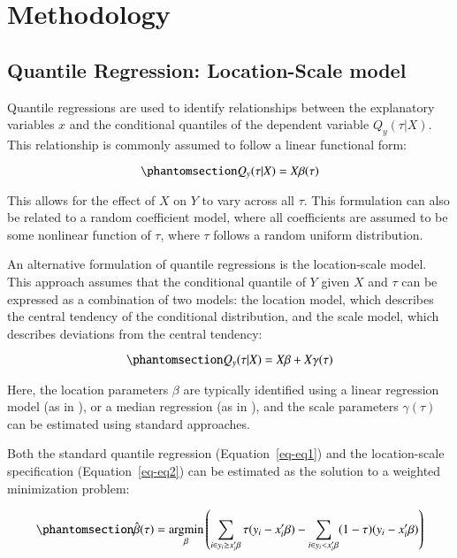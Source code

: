 \documentclass[
  authoryear,
  review,
  1p]{elsarticle}
\begin{document}
\section{Methodology}\label{sec-method}

\subsection{Quantile Regression: Location-Scale model}\label{sec-betas}

Quantile regressions are used to identify relationships between the
explanatory variables \(x\) and the conditional quantiles of the
dependent variable \(Q_y(\tau|X)\). This relationship is commonly
assumed to follow a linear functional form:

\begin{equation}\phantomsection\label{eq-eq1}{Q_y(\tau|X) =X\beta(\tau)
}\end{equation}

This allows for the effect of \(X\) on \(Y\) to vary across all
\(\tau\). This formulation can also be related to a random coefficient
model, where all coefficients are assumed to be some nonlinear function
of \(\tau\), where \(\tau\) follows a random uniform distribution.

An alternative formulation of quantile regressions is the location-scale
model. This approach assumes that the conditional quantile of \(Y\)
given \(X\) and \(\tau\) can be expressed as a combination of two
models: the location model, which describes the central tendency of the
conditional distribution, and the scale model, which describes
deviations from the central tendency:

\begin{equation}\phantomsection\label{eq-eq2}{Q_y(\tau|X) =X\beta+X\gamma(\tau)
}\end{equation}

Here, the location parameters \(\beta\) are typically identified using a
linear regression model (as in \citet{mss2019}), or a median regression
(as in \citet{zhao2000}), and the scale parameters \(\gamma(\tau)\) can
be estimated using standard approaches.

Both the standard quantile regression (Equation~\ref{eq-eq1}) and the
location-scale specification (Equation~\ref{eq-eq2}) can be estimated as
the solution to a weighted minimization problem:

\begin{equation}\phantomsection\label{eq-eq3}{\hat{\beta}(\tau) = \underset{\beta}{\operatorname{argmin}}
\left( \sum_{i\in y_i\geq x_i'\beta} \tau (y_i - x_i'\beta) - \sum_{i\in y_i<x_i'\beta} (1-\tau)(y_i - x_i'\beta) \right)
}\end{equation}
\end{document}
